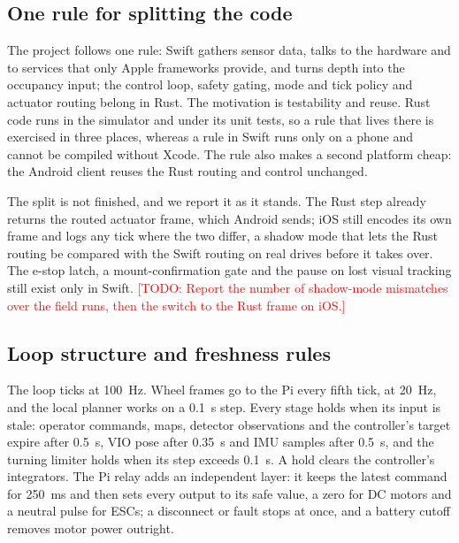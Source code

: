 \documentclass[conference]{IEEEtran}
\newcommand{\todo}[1]{\textcolor{red}{[TODO: #1]}}
\begin{document}
\subsection{One rule for splitting the code}
The project follows one rule: Swift gathers sensor data, talks to the hardware and to services that only Apple frameworks provide, and turns depth into the occupancy input; the control loop, safety gating, mode and tick policy and actuator routing belong in Rust.
The motivation is testability and reuse.
Rust code runs in the simulator and under its unit tests, so a rule that lives there is exercised in three places, whereas a rule in Swift runs only on a phone and cannot be compiled without Xcode.
The rule also makes a second platform cheap: the Android client reuses the Rust routing and control unchanged.

The split is not finished, and we report it as it stands.
The Rust step already returns the routed actuator frame, which Android sends; iOS still encodes its own frame and logs any tick where the two differ, a shadow mode that lets the Rust routing be compared with the Swift routing on real drives before it takes over.
The e-stop latch, a mount-confirmation gate and the pause on lost visual tracking still exist only in Swift.
\todo{Report the number of shadow-mode mismatches over the field runs, then the switch to the Rust frame on iOS.}

\subsection{Loop structure and freshness rules}
The loop ticks at 100~Hz.
Wheel frames go to the Pi every fifth tick, at 20~Hz, and the local planner works on a 0.1~s step.
Every stage holds when its input is stale: operator commands, maps, detector observations and the controller's target expire after 0.5~s, VIO pose after 0.35~s and IMU samples after 0.5~s, and the turning limiter holds when its step exceeds 0.1~s.
A hold clears the controller's integrators.
The Pi relay adds an independent layer: it keeps the latest command for 250~ms and then sets every output to its safe value, a zero for DC motors and a neutral pulse for ESCs; a disconnect or fault stops at once, and a battery cutoff removes motor power outright.
\end{document}
